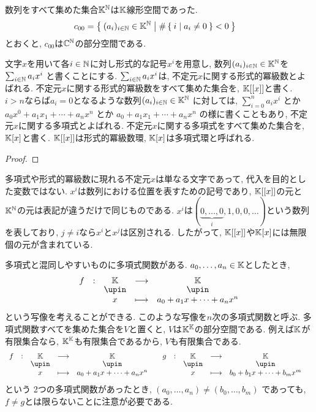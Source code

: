 \begin{example}
  数列をすべて集めた集合$\mathbb{K}^{\mathbb{N}}$は$\mathbb{K}$線形空間であった.
  \begin{align*}
    c_{00}&=\Set{(a_i)_{i\in\mathbb{N}} \in \mathbb{K}^{\mathbb{N}} | \#\Set{i| a_i \neq 0} < 0}
  \end{align*}
  とおくと, $c_{00}$は$\mathbb{C}^{\mathbb{N}}$の部分空間である.
  
  文字$x$を用いて各$i\in\mathbb{N}$に対し形式的な記号$x^i$を用意し,
  数列$(a_i)_{i\in\mathbb{N}} \in \mathbb{K}^{\mathbb{N}}$を
  $\sum_{i\in \mathbb{N}} a_ix^i$
  と書くことにする.
  $\sum_{i\in \mathbb{N}} a_ix^i$は,
  不定元$x$に関する形式的冪級数とよばれる.
  不定元$x$に関する形式的冪級数をすべて集めた集合を,
  $\mathbb{K}[[x]]$と書く.
  $i>n$ならば$a_i=0$となるような数列$(a_i)_{i\in\mathbb{N}} \in \mathbb{K}^{\mathbb{N}}$
  に対しては,
  $\sum_{i=0}^{n} a_ix^i$
  とか
  $a_0x^0+a_1x_1+\cdots+a_nx^n$
  とか
  $a_0+a_1x_1+\cdots+a_nx^n$
  の様に書くこともあり,
  不定元$x$に関する多項式とよばれる.
  不定元$x$に関する多項式をすべて集めた集合を,
  $\mathbb{K}[x]$と書く.
  $\mathbb{K}[[x]]$は形式的冪級数環,
  $\mathbb{K}[x]$は多項式環と呼ばれる.
\end{example}
\begin{proof}\end{proof}
\begin{remark}
  多項式や形式的冪級数に現れる不定元$x$は単なる文字であって,
  代入を目的とした変数ではない.
  $x^i$は数列における位置を表すための記号であり,
  $\mathbb{K}[[x]]$の元と$\mathbb{K}^{\mathbb{N}}$の元は表記が違うだけで同じものである.
  $x^i$は$(\underbrace{0,\ldots,0}_{i},1,0,0,\ldots)$という数列を表しており,
  $j\neq i$なら$x^i$と$x^j$は区別される.
  したがって,
  $\mathbb{K}[[x]]$や$\mathbb{K}[x]$には無限個の元が含まれている.

  多項式と混同しやすいものに多項式関数がある.
  $a_0,\ldots, a_n\in \mathbb{K}$としたとき,
  \begin{align*}
  \shazo{f}{\KK}{\KK}
  {x}{a_0+a_1x+\cdots+a_nx^n}
  \end{align*}
  という写像を考えることができる.
  このような写像を$n$次の多項式関数と呼ぶ.
  多項式関数すべてを集めた集合を$V$と置くと,
  $V$は$\mathbb{K}^{\mathbb{K}}$の部分空間である.
  例えば$\mathbb{K}$が有限集合なら,
  $\mathbb{K}^{\mathbb{K}}$も有限集合であるから,
  $V$も有限集合である.
  \begin{align*}
  &\shazo{f}{\KK}{\KK}
  {x}{a_0+a_1x+\cdots+a_nx^n}
  &
  &\shazo{g}{\KK}{\KK}
  {x}{b_0+b_1x+\cdots+b_mx^m}
  \end{align*}
  という
  2つの多項式関数があったとき,
  $(a_0,\ldots,a_n)\neq (b_0,\ldots,b_m)$
  であっても, $f\neq g$とは限らないことに注意が必要である.
\end{remark}

